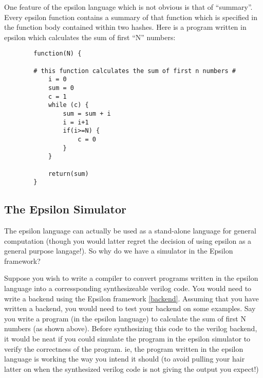 \documentclass[titlepage]{article}
\begin{document}
    One feature of the epsilon language which is not obvious is that of  ``summary''. Every epsilon function contains a summary of that function which is specified in the function body contained within two hashes.
    Here is a program written in epsilon which calculates the sum of first ``N'' numbers:
    \begin{verbatim}
        function(N) {
            
        # this function calculates the sum of first n numbers #
            i = 0
            sum = 0
            c = 1
            while (c) {
                sum = sum + i
                i = i+1
                if(i>=N) {
                    c = 0
                }
            }
            
            return(sum)
        }
    \end{verbatim}
    
    \subsection{The Epsilon Simulator}
    \label{simulator}
    The epsilon language can actually be used as a stand-alone language for general computation (though you would latter regret
    the decision of using epsilon as a general purpose langage!). So why do we have a simulator in the Epsilon framework?


    Suppose you wish to write a compiler to convert programs written in the epsilon language into a corressponding 
    synthesizeable verilog code. You would need to write a backend using the Epsilon framework \ref{backend}. Assuming that you have 
    written a backend, you would need to test your backend on some examples. Say you write a program (in the epsilon language) 
    to calculate
    the sum of first N numbers (as shown above). Before synthesizing this code to the verilog backend, it would be neat if you could simulate the program
    in the epsilon simulator to verify the correctness of the program. ie, the program written in the epsilon language is working the way you intend it should (to avoid pulling your hair latter on when the synthesized verilog code is not giving the output you expect!)
\end{document}
